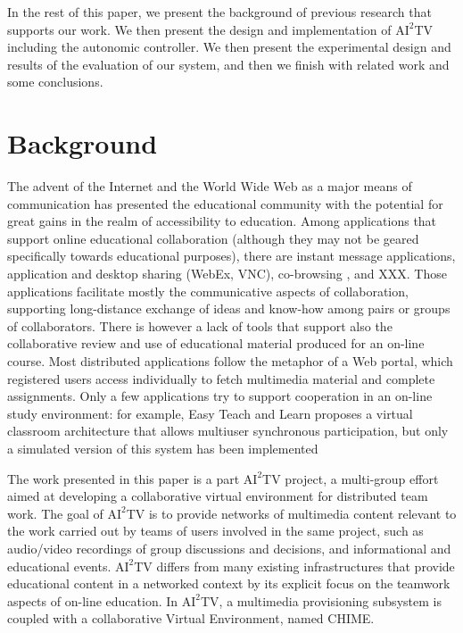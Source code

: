\documentclass{sig-alternate}
\begin{document}
In the rest of this paper, we present the background of previous
research that supports our work.  We then present the design and
implementation of $\mathrm{AI}^2$TV including the autonomic controller.
We then present the experimental design and results of the evaluation
of our system, and then we finish with related work and some conclusions.

\section{Background} \label{background}
The advent of the Internet and the World Wide Web as a major means of
communication has presented the educational community with the
potential for great gains in the realm of accessibility to education.
Among applications that support online educational collaboration
(although they may not be geared specifically towards educational
purposes), there are instant message applications, application and
desktop sharing (WebEx, VNC), co-browsing \cite{CAPPS, LIEBERMAN,
SIDLER}, and XXX.  Those applications facilitate mostly the
communicative aspects of collaboration, supporting long-distance
exchange of ideas and know-how among pairs or groups of collaborators.
There is however a lack of tools that support also the collaborative
review and use of educational material produced for an on-line course.
Most distributed applications follow the metaphor of a Web portal,
which registered users access individually to fetch multimedia
material and complete assignments.  Only a few applications try to
support cooperation in an on-line study environment: for example, Easy
Teach and Learn proposes a virtual classroom architecture that allows
multiuser synchronous participation, but only a simulated version of
this system has been implemented \cite{WALTER}

The work presented in this paper is a part $\mathrm{AI}^2$TV project,
a multi-group effort aimed at developing a collaborative virtual
environment for distributed team work.  The goal of $\mathrm{AI}^2$TV
is to provide networks of multimedia content relevant to the work
carried out by teams of users involved in the same project, such as
audio/video recordings of group discussions and decisions, and
informational and educational events.  $\mathrm{AI}^2$TV differs from
many existing infrastructures that provide educational content in a
networked context by its explicit focus on the teamwork aspects of
on-line education.  In $\mathrm{AI}^2$TV, a multimedia provisioning
subsystem is coupled with a collaborative Virtual Environment, named
CHIME\cite{CHIME}.
\end{document}
